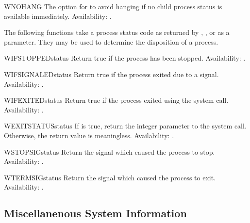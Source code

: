 \begin{datadesc}{WNOHANG}
The option for  to avoid hanging if no child
process status is available immediately.
Availability: \UNIX{}.
\end{datadesc}

The following functions take a process status code as returned by
, , or  as a
parameter.  They may be used to determine the disposition of a
process.

\begin{funcdesc}{WIFSTOPPED}{status}
Return true if the process has been stopped.
Availability: \UNIX{}.
\end{funcdesc}

\begin{funcdesc}{WIFSIGNALED}{status}
Return true if the process exited due to a signal.
Availability: \UNIX{}.
\end{funcdesc}

\begin{funcdesc}{WIFEXITED}{status}
Return true if the process exited using the  system
call.
Availability: \UNIX{}.
\end{funcdesc}

\begin{funcdesc}{WEXITSTATUS}{status}
If  is true, return the integer
parameter to the  system call.  Otherwise, the return 
value is meaningless.
Availability: \UNIX{}.
\end{funcdesc}

\begin{funcdesc}{WSTOPSIG}{status}
Return the signal which caused the process to stop.
Availability: \UNIX{}.
\end{funcdesc}

\begin{funcdesc}{WTERMSIG}{status}
Return the signal which caused the process to exit.
Availability: \UNIX{}.
\end{funcdesc}


\subsection{Miscellanenous System Information \label{os-path}}


